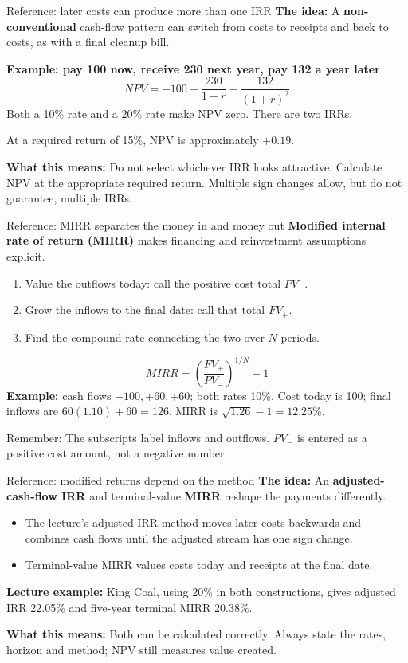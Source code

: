 \documentclass[10pt,aspectratio=169]{beamer}
\newcommand{\idea}[1]{\textbf{The idea:} #1\par\smallskip}
\newcommand{\inpractice}[1]{\par\smallskip\textbf{What this means:} #1}
\newcommand{\remember}[1]{\par\smallskip\alert{Remember:} #1}
\begin{document}
\begin{frame}{Reference: later costs can produce more than one IRR}
\idea{A \textbf{non-conventional} cash-flow pattern can switch from costs to receipts and back to costs, as with a final cleanup bill.}
\textbf{Example: pay 100 now, receive 230 next year, pay 132 a year later}
\[
NPV=-100+\frac{230}{1+r}-\frac{132}{(1+r)^2}
\]
Both a 10\% rate and a 20\% rate make NPV zero. There are two IRRs.
\par\smallskip
At a required return of 15\%, NPV is approximately $+0.19$.
\inpractice{Do not select whichever IRR looks attractive. Calculate NPV at the appropriate required return. Multiple sign changes allow, but do not guarantee, multiple IRRs.}
\end{frame}

\begin{frame}{Reference: MIRR separates the money in and money out}
\textbf{Modified internal rate of return (MIRR)} makes financing and reinvestment assumptions explicit.
\begin{enumerate}
\item Value the outflows today: call the positive cost total $PV_-$.
\item Grow the inflows to the final date: call that total $FV_+$.
\item Find the compound rate connecting the two over $N$ periods.
\end{enumerate}
\[
MIRR=\left(\frac{FV_+}{PV_-}\right)^{1/N}-1
\]
\textbf{Example:} cash flows $-100,+60,+60$; both rates 10\%. Cost today is 100; final inflows are $60(1.10)+60=126$. MIRR is $\sqrt{1.26}-1=12.25\%$.
\remember{The subscripts label inflows and outflows. $PV_-$ is entered as a positive cost amount, not a negative number.}
\end{frame}

\begin{frame}{Reference: modified returns depend on the method}
\idea{An \textbf{adjusted-cash-flow IRR} and terminal-value \textbf{MIRR} reshape the payments differently.}
\begin{itemize}
\item The lecture's adjusted-IRR method moves later costs backwards and combines cash flows until the adjusted stream has one sign change.
\item Terminal-value MIRR values costs today and receipts at the final date.
\end{itemize}
\textbf{Lecture example:} King Coal, using 20\% in both constructions, gives adjusted IRR 22.05\% and five-year terminal MIRR 20.38\%.
\inpractice{Both can be calculated correctly. Always state the rates, horizon and method; NPV still measures value created.}
\end{frame}
\end{document}
